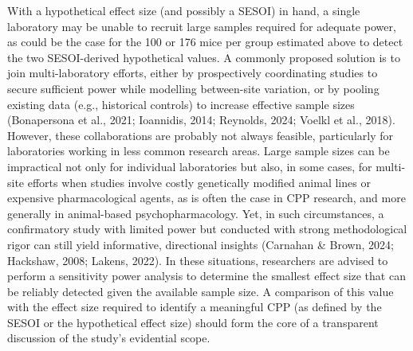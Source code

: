 \documentclass[authordate, meta, issue]{jote-new-article}
\begin{document}
	With a hypothetical effect size (and possibly a SESOI) in hand, a single laboratory may be unable to recruit large samples required for adequate power, as could be the case for the 100 or 176 mice per group estimated above to detect the two SESOI-derived hypothetical values. A commonly proposed solution is to join multi-laboratory efforts, either by prospectively coordinating studies to secure sufficient power while modelling between-site variation, or by pooling existing data (e.g., historical controls) to increase effective sample sizes (Bonapersona et al., 2021; Ioannidis, 2014; Reynolds, 2024; Voelkl et al., 2018). However, these collaborations are probably not always feasible, particularly for laboratories working in less common research areas. Large sample sizes can be impractical not only for individual laboratories but also, in some cases, for multi-site efforts when studies involve costly genetically modified animal lines or expensive pharmacological agents, as is often the case in CPP research, and more generally in animal-based psychopharmacology. Yet, in such circumstances, a confirmatory study with limited power but conducted with strong methodological rigor can still yield informative, directional insights (Carnahan \& Brown, 2024; Hackshaw, 2008; Lakens, 2022). In these situations, researchers are advised to perform a sensitivity power analysis to determine the smallest effect size that can be reliably detected given the available sample size. A comparison of this value with the effect size required to identify a meaningful CPP (as defined by the SESOI or the hypothetical effect size) should form the core of a transparent discussion of the study's evidential scope.
\end{document}
